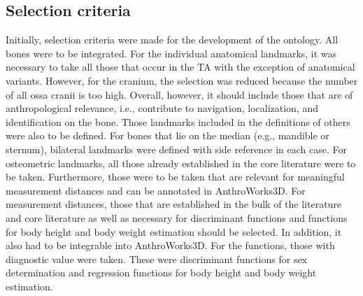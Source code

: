 \documentclass[sw]{iosart2x}
\newcommand{\aw}{AnthroWorks3D}
\begin{document}
\subsection{Selection criteria}
Initially, selection criteria were made for the development of the ontology.
All bones were to be integrated.
For the individual anatomical landmarks, it was necessary to take all those that occur in the TA with the exception of anatomical variants.
However, for the cranium, the selection was reduced because the number of all ossa cranii is too high.
Overall, however, it should include those that are of anthropological relevance, i.e., contribute to navigation, localization, and identification on the bone.
Those landmarks included in the definitions of others were also to be defined.
For bones that lie on the median (e.g., mandible or sternum), bilateral landmarks were defined with side reference in each case.
For osteometric landmarks, all those already established in the core literature were to be taken.
Furthermore, those were to be taken that are relevant for meaningful measurement distances and can be annotated in \aw{}.
For measurement distances, those that are established in the bulk of the literature and core literature as well as necessary for discriminant functions and functions for body height and body weight estimation should be selected.
In addition, it also had to be integrable into \aw{}.
For the functions, those with diagnostic value were taken.
These were discriminant functions for sex determination and regression functions for body height and body weight estimation.
\end{document}
